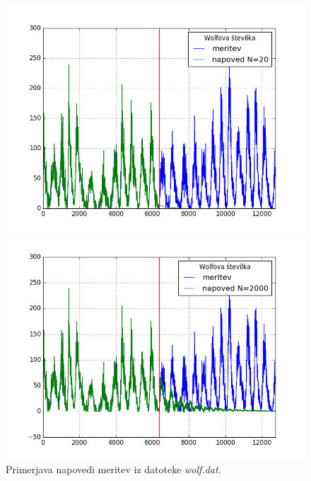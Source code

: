 \documentclass[slovene,11pt,a4paper]{article}
\numberwithin{equation}{section} %
\numberwithin{figure}{section} %
\numberwithin{table}{section} %
\begin{document}
\begin{figure}[!t]
\centering
\begin{minipage}{0.5\textwidth}
\centering
\includegraphics[scale=0.45]{slike/napoved_wolf20.png}
\end{minipage}\hfill
\begin{minipage}{0.5\textwidth}
\centering
\includegraphics[scale=0.45]{slike/napoved_wolf2000.png}
\end{minipage}

\caption{Primerjava napovedi meritev iz datoteke \textsl{wolf.dat}. }
\end{figure}


\FloatBarrier
\end{document}
